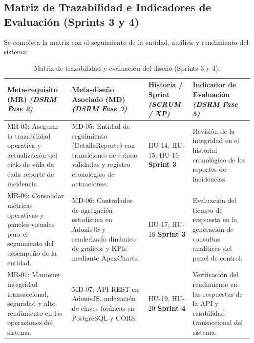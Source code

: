 \subsection{Matriz de Trazabilidad e Indicadores de Evaluación (Sprints 3 y 4)}

Se completa la matriz con el seguimiento de la entidad, análisis y rendimiento del sistema:

\begin{table}[htbp]
	\centering
	\caption{Matriz de trazabilidad y evaluación del diseño (Sprints 3 y 4).}
	\label{tab:trazabilidad_parte2}
	\begin{tabularx}{\textwidth}{|X|X|X|X|}
		\hline
		\textbf{Meta-requisito (MR)} \newline \textit{(DSRM Fase 2)} & 
		\textbf{Meta-diseño Asociado (MD)} \newline \textit{(DSRM Fase 3)} & 
		\textbf{Historia / Sprint} \newline \textit{(SCRUM / XP)} & 
		\textbf{Indicador de Evaluación} \newline \textit{(DSRM Fase 5)} \\ \hline
		MR-05: Asegurar la trazabilidad operativa y actualización del ciclo de vida de cada reporte de incidencia. & 
		MD-05: Entidad de seguimiento (DetalleReporte) con transiciones de estado validadas y registro cronológico de actuaciones. & 
		HU-14, HU-15, HU-16 \newline \textbf{Sprint 3} & 
		Revisión de la integridad en el historial cronológico de los reportes de incidencias. \\ \hline
		MR-06: Consolidar métricas operativas y paneles visuales para el seguimiento del desempeño de la entidad. & 
		MD-06: Controlador de agregación estadística en AdonisJS y renderizado dinámico de gráficos y KPIs mediante ApexCharts. & 
		HU-17, HU-18 \newline \textbf{Sprint 3} & 
		Evaluación del tiempo de respuesta en la generación de consultas analíticas del panel de control. \\ \hline
		MR-07: Mantener integridad transaccional, seguridad y alto rendimiento en las operaciones del sistema. & 
		MD-07: API REST en AdonisJS, indexación de claves foráneas en PostgreSQL y CORS. & 
		HU-19, HU-20 \newline \textbf{Sprint 4} & 
		Verificación del rendimiento en las respuestas de la API y estabilidad transaccional del sistema. \\ \hline
	\end{tabularx}
\end{table}

